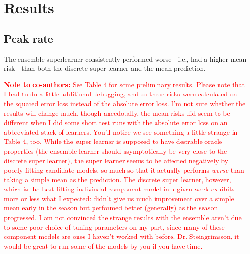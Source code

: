 \documentclass[10pt,letterpaper]{article}
\begin{document}
\hypertarget{results}{%
\section{Results}\label{results}}

\hypertarget{peak-rate}{%
\subsection{Peak rate}\label{peak-rate}}

The ensemble superlearner consistently performed worse---i.e., had a
higher mean risk---than both the discrete super learner and the mean
prediction.

\textcolor{red}{\textbf{Note to co-authors:} See Table 4 for some preliminary results. Please note that I had to do a little additional debugging, and so these risks were calculated on the squared error loss instead of the absolute error loss. I'm not sure whether the results will change much, though anecdotally, the mean risks did seem to be different when I did some short test runs with the absolute error loss on an abbreviated stack of learners. You'll notice we see something a little strange in Table 4, too. While the super learner is supposed to have desirable oracle properties (the ensemble learner should asymptotically be very close to the discrete super learner), the super learner seems to be affected negatively by poorly fitting candidate models, so much so that it actually performs \emph{worse} than taking a simple mean as the prediction. The discrete super learner, however, which is the best-fitting indiviudal component model in a given week exhibits more or less what I expected: didn't give us much improvement over a simple mean early in the season but performed better (generally) as the season progressed. I am not convinced the strange results with the ensemble aren't due to some poor choice of tuning parameters on my part, since many of these component models are ones I haven't worked with before. Dr. Steingrimsson, it would be great to run some of the models by you if you have time.}
\end{document}
